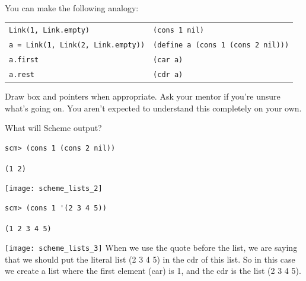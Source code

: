 \begin{nonsol}
You can make the following analogy:
\begin{center}
\begin{tabular}{ |l|l| }
\hline
 \texttt{Link(1, Link.empty)} & \texttt{(cons 1 nil)} \\
 \texttt{a = Link(1, Link(2, Link.empty))} & \texttt{(define a (cons 1 (cons 2 nil)))}  \\
 \texttt{a.first} & \texttt{(car a)} \\
 \texttt{a.rest} & \texttt{(cdr a)} \\
 \hline
\end{tabular}

\end{center}
 Draw box and pointers when appropriate. Ask your mentor if you're unsure what's going on. You aren't expected to understand this completely on your own.
\end{nonsol}
\question What will Scheme output?
\begin{lstlisting}
scm> (cons 1 (cons 2 nil))
\end{lstlisting}
\begin{solution}[0.25in]
\texttt{(1 2)}
\begin{center}
\texttt{[image: scheme\_lists\_2]}
\end{center}
\end{solution}

\begin{lstlisting}
scm> (cons 1 '(2 3 4 5))
\end{lstlisting}
\begin{solution}[0.25in]
\texttt{(1 2 3 4 5)}
\begin{center}
\texttt{[image: scheme\_lists\_3]}
When we use the quote before the list, we are saying that we should put the literal list (2 3 4 5) in the cdr of this list. So in this case we create a list where the first element (car) is 1, and the cdr is the list (2 3 4 5).
\end{center}
\end{solution}

